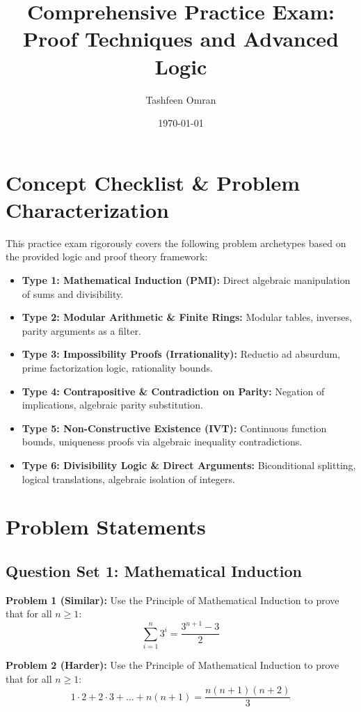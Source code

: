 \documentclass{article}
\title{Comprehensive Practice Exam: Proof Techniques and Advanced Logic}
\author{Tashfeen Omran}
\date{\today}
\begin{document}
\maketitle
\tableofcontents
\newpage

\section{Concept Checklist \& Problem Characterization}
This practice exam rigorously covers the following problem archetypes based on the provided logic and proof theory framework:
\begin{itemize}
    \item \textbf{Type 1: Mathematical Induction (PMI):} Direct algebraic manipulation of sums and divisibility.
    \item \textbf{Type 2: Modular Arithmetic \& Finite Rings:} Modular tables, inverses, parity arguments as a filter.
    \item \textbf{Type 3: Impossibility Proofs (Irrationality):} Reductio ad absurdum, prime factorization logic, rationality bounds.
    \item \textbf{Type 4: Contrapositive \& Contradiction on Parity:} Negation of implications, algebraic parity substitution.
    \item \textbf{Type 5: Non-Constructive Existence (IVT):} Continuous function bounds, uniqueness proofs via algebraic inequality contradictions.
    \item \textbf{Type 6: Divisibility Logic \& Direct Arguments:} Biconditional splitting, logical translations, algebraic isolation of integers.
\end{itemize}

\vspace{1cm}

\section{Problem Statements}

\subsection{Question Set 1: Mathematical Induction}
\noindent\textbf{Problem 1 (Similar):} Use the Principle of Mathematical Induction to prove that for all $n \ge 1$:
\[ \sum_{i=1}^n 3^i = \frac{3^{n+1}-3}{2} \]

\noindent\textbf{Problem 2 (Harder):} Use the Principle of Mathematical Induction to prove that for all $n \ge 1$:
\[ 1 \cdot 2 + 2 \cdot 3 + \dots + n(n+1) = \frac{n(n+1)(n+2)}{3} \]
\end{document}

